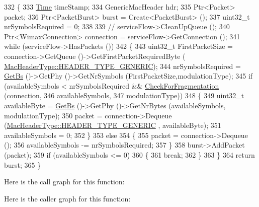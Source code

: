 \begin{DoxyCode}
332 \{
333   \hyperlink{namespacens3_1_1TracedValueCallback_a7ffd3e7c142ffe7c8a1d2db9b8de38ec}{Time} timeStamp;
334   GenericMacHeader hdr;
335   Ptr<Packet> packet;
336   Ptr<PacketBurst> burst = Create<PacketBurst> ();
337   uint32\_t nrSymbolsRequired = 0;
338 
339   \textcolor{comment}{// serviceFlow->CleanUpQueue ();}
340   Ptr<WimaxConnection> connection = serviceFlow->GetConnection ();
341   \textcolor{keywordflow}{while} (serviceFlow->HasPackets ())
342     \{
343       uint32\_t FirstPacketSize = connection->GetQueue ()->GetFirstPacketRequiredByte (
      \hyperlink{classns3_1_1MacHeaderType_a54d8fc8bc93a2b7865627965cdd31c20a48fe5b2f20cadf78008c71469b518403}{MacHeaderType::HEADER\_TYPE\_GENERIC});
344       nrSymbolsRequired = \hyperlink{classns3_1_1BSScheduler_a8b09065ac8f74cb35446af55128e41c7}{GetBs} ()->GetPhy ()->GetNrSymbols (FirstPacketSize,modulationType);
345       \textcolor{keywordflow}{if} (availableSymbols < nrSymbolsRequired && \hyperlink{classns3_1_1BSScheduler_aedd94450afdda0371fae56e05624bfaf}{CheckForFragmentation} (connection,
346                                                                          availableSymbols,
347                                                                          modulationType))
348         \{
349           uint32\_t availableByte = \hyperlink{classns3_1_1BSScheduler_a8b09065ac8f74cb35446af55128e41c7}{GetBs} ()->GetPhy ()->GetNrBytes (availableSymbols, modulationType);
350           packet = connection->Dequeue (\hyperlink{classns3_1_1MacHeaderType_a54d8fc8bc93a2b7865627965cdd31c20a48fe5b2f20cadf78008c71469b518403}{MacHeaderType::HEADER\_TYPE\_GENERIC}
      , availableByte);
351           availableSymbols = 0;
352         \}
353       \textcolor{keywordflow}{else}
354         \{
355           packet = connection->Dequeue ();
356           availableSymbols -= nrSymbolsRequired;
357         \}
358       burst->AddPacket (packet);
359       \textcolor{keywordflow}{if} (availableSymbols <= 0)
360         \{
361           \textcolor{keywordflow}{break};
362         \}
363     \}
364   \textcolor{keywordflow}{return} burst;
365 \}
\end{DoxyCode}


Here is the call graph for this function\+:




Here is the caller graph for this function\+:


